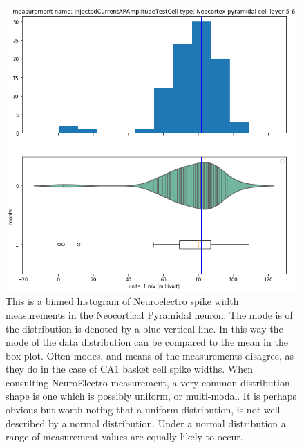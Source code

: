 \begin{figure}
\begin{center}
\includegraphics[width=0.7\linewidth]{chapters/notebooks_converted/needata_thesis_files/needata_thesis_5_16}
\caption{This is a binned histogram of Neuroelectro spike width measurements in the Neocortical Pyramidal neuron.
The mode is of the distribution is denoted by a blue vertical line. In this way the mode of the data distribution can be compared to the mean in the box plot. Often modes, and means of the measurements disagree, as they do in the case of CA1 basket cell spike widths. When consulting NeuroElectro measurement, a very common distribution shape is one which is possibly uniform, or multi-modal. It is perhaps obvious but worth noting that a uniform distribution, is not well described by a normal distribution. Under a normal distribution a range of measurement values are equally likely to occur.}
\label{fig:uniform-feature}
\end{center}
\end{figure}

